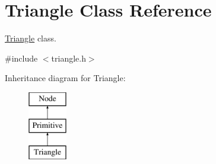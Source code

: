 \hypertarget{class_triangle}{
\section{\-Triangle \-Class \-Reference}
\label{class_triangle}
}


\hyperlink{class_triangle}{\-Triangle} class.  




{\ttfamily \#include $<$triangle.\-h$>$}

\-Inheritance diagram for \-Triangle\-:\begin{figure}[H]
\begin{center}
\leavevmode
\includegraphics[height=3.000000cm]{class_triangle}
\end{center}
\end{figure}
